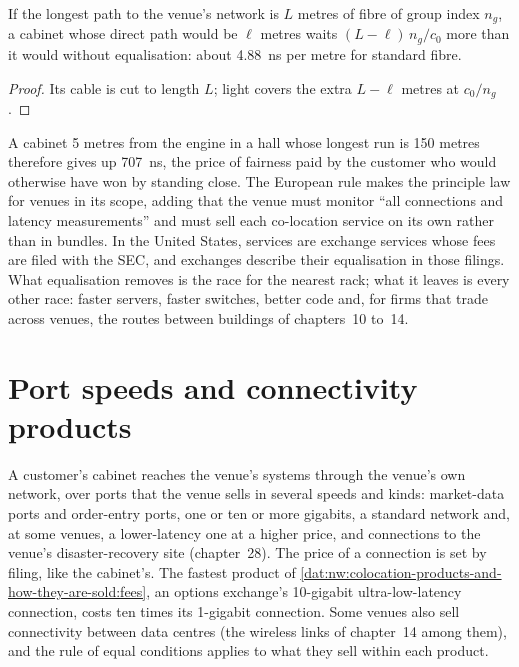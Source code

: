 \begin{proposition}\label{prop:nw:colocation-products-and-how-they-are-sold:coil}
If the longest path to the venue's network is $L$ metres of fibre of group index $n_g$, a cabinet whose direct path would be $\ell$ metres
waits $(L - \ell)\,n_g / c_0$ more than it would without equalisation: about \qty{4.88}{\nano\second} per metre for standard fibre.
\end{proposition}

\begin{proof}
Its cable is cut to length $L$; light covers the extra $L-\ell$ metres at $c_0/n_g$.
\end{proof}

A cabinet 5 metres from the engine in a hall whose longest run is 150 metres therefore gives up \qty{707}{\nano\second}, the price of
fairness paid by the customer who would otherwise have won by standing close. The European rule makes the principle law for venues in its
scope, adding that the venue must monitor ``all connections and latency measurements'' and must sell each co-location service on its own
rather than in bundles. In the United States,  services are exchange services whose fees are filed with the SEC, and exchanges
describe their equalisation in those filings. What equalisation removes is the race for the nearest rack; what it leaves is every other
race: faster servers, faster switches, better code and, for firms that trade across venues, the routes between buildings of chapters~10
to~14.

\section{Port speeds and connectivity products}

A customer's cabinet reaches the venue's systems through the venue's own network, over ports that the venue sells in several speeds and
kinds: market-data ports and order-entry ports, one or ten or more gigabits, a standard network and, at some venues, a lower-latency one
at a higher price, and connections to the venue's disaster-recovery site (chapter~28). The price of a connection is set by filing, like
the cabinet's. The fastest product of \cref{dat:nw:colocation-products-and-how-they-are-sold:fees}, an options exchange's 10-gigabit
ultra-low-latency connection, costs ten times its 1-gigabit connection. Some venues also sell connectivity between data centres
(the wireless links of chapter~14 among them), and the rule of equal conditions applies to what they sell within each product.

